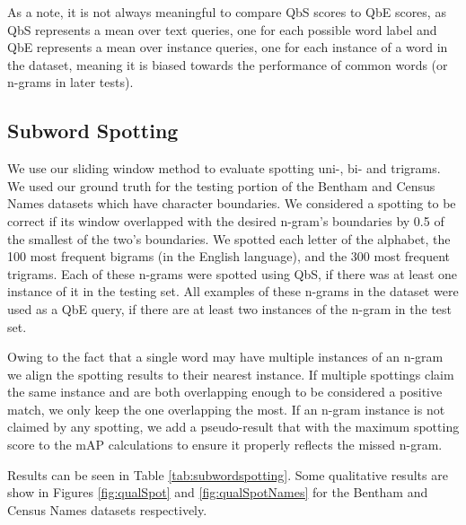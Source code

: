 \documentclass[ms,electronic,twosidetoc,letterpaper,chaptercenter,parttop,lof,lot]{byumsphd}
\begin{document}
As a note, it is not always meaningful to compare QbS scores to QbE scores, as QbS represents a mean over text queries, one for each possible word label and QbE represents a mean over instance queries, one for each instance of a word in the dataset, meaning it is biased towards the performance of common words (or n-grams in later tests).

\subsection{Subword Spotting}

We use our sliding window method to evaluate spotting uni-, bi- and trigrams. We used our ground truth for the testing portion of the Bentham and Census Names datasets which have character boundaries. We considered a spotting to be correct if its window overlapped with the desired n-gram's boundaries by 0.5 of the smallest of the two's boundaries.
We spotted each letter of the alphabet, the 100 most frequent bigrams (in the English language), and the 300 most frequent trigrams. Each of these n-grams were spotted using QbS, if there was at least one instance of it in the testing set. All examples of these n-grams in the dataset were used as a QbE query, if there are at least two instances of the n-gram in the test set.

Owing to the fact that a single word may have multiple instances of an n-gram we align the spotting results to their nearest instance. If multiple spottings claim the same instance and are both overlapping enough to be considered a positive match, we only keep the one overlapping the most.
If an n-gram instance is not claimed by any spotting, we add a pseudo-result that with the maximum spotting score to the mAP calculations to ensure it properly reflects the missed n-gram.

Results can be seen in Table \ref{tab:subwordspotting}.
Some qualitative results are show in Figures \ref{fig:qualSpot} and \ref{fig:qualSpotNames} for the Bentham and Census Names datasets respectively.


\end{document}
